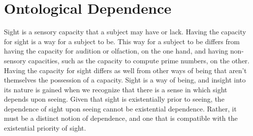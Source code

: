 \documentclass[12pt]{article}
\begin{document}

\section{Ontological Dependence} %
\label{sec:capacities_and_their_exercise_ontological_dependence}

Sight is a sensory capacity that a subject may have or lack. Having the capacity for sight is a way for a subject to be. This way for a subject to be differs from having the capacity for audition or olfaction, on the one hand, and having non-sensory capacities, such as the capacity to compute prime numbers, on the other. Having the capacity for sight differs as well from other ways of being that aren't themselves the possession of a capacity. Sight is a way of being, and insight into its nature is gained when we recognize that there is a sense in which sight depends upon seeing. Given that sight is existentially prior to seeing, the dependence of sight upon seeing cannot be existential dependence. Rather, it must be a distinct notion of dependence, and one that is compatible with the existential priority of sight.
\end{document}
